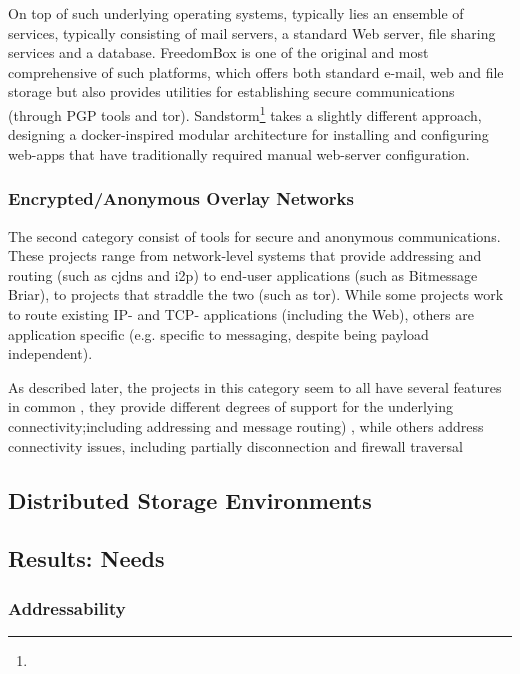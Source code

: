 \documentclass{acm_proc_article-sp}
\begin{document}
{On top of such underlying operating systems, typically lies an ensemble of services, typically consisting of mail servers, a standard Web server, file sharing services and a database. FreedomBox is one of the original and most comprehensive of such platforms, which offers both standard e-mail, web and file storage but also provides utilities for establishing secure communications (through PGP tools and tor).  Sandstorm\footnote{} takes a slightly different approach, designing a docker-inspired modular architecture for installing and configuring web-apps that have traditionally required manual web-server configuration. 

\subsubsection{Encrypted/Anonymous Overlay Networks}

The second category consist of tools for secure and anonymous communications.  These projects range from network-level systems that provide addressing and routing (such as cjdns and i2p) to end-user applications (such as Bitmessage Briar), to projects that straddle the two (such as tor). While some projects work to route existing IP- and TCP- applications (including the Web), others are application specific (e.g. specific to messaging, despite being payload independent).

As described later, the projects in this category seem to all have several features in common , they provide different degrees of support for the underlying connectivity;including addressing and message routing) , while others address connectivity issues, including partially disconnection and firewall traversal


\subsection{Distributed Storage Environments}

\subsection{Results: Needs}

\subsubsection{Addressability}
}
\end{document}
